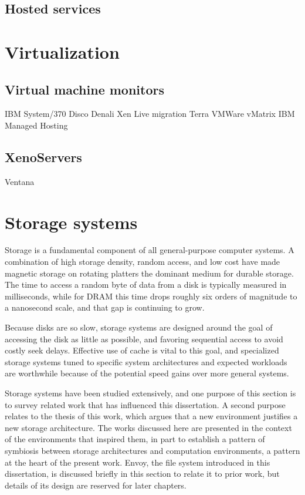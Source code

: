 \subsection{Hosted services}

\section{Virtualization}

\subsection{Virtual machine monitors}
IBM System/370 \cite{gum}
Disco
Denali
Xen \cite{barham}
Live migration \cite{clark} \cite{sapuntzakis02}
Terra \cite{garfinkel}
VMWare
vMatrix \cite{awadallah}
IBM Managed Hosting

\subsection{XenoServers}
\cite{kotsovinos04a,kotsovinos04b}

Ventana \cite{pfaff}

\section{Storage systems}

Storage is a fundamental component of all general-purpose computer systems. A combination of high storage density, random access, and low cost have made magnetic storage on rotating platters the dominant medium for durable storage. The time to access a random byte of data from a disk is typically measured in milliseconds, while for DRAM this time drops roughly six orders of magnitude to a nanosecond scale, and that gap is continuing to grow.

Because disks are so slow, storage systems are designed around the goal of accessing the disk as little as possible, and favoring sequential access to avoid costly seek delays. Effective use of cache is vital to this goal, and specialized storage systems tuned to specific system architectures and expected workloads are worthwhile because of the potential speed gains over more general systems.

Storage systems have been studied extensively, and one purpose of this section is to survey related work that has influenced this dissertation. A second purpose relates to the thesis of this work, which argues that a new environment justifies a new storage architecture. The works discussed here are presented in the context of the environments that inspired them, in part to establish a pattern of symbiosis between storage architectures and computation environments, a pattern at the heart of the present work. Envoy, the file system introduced in this dissertation, is discussed briefly in this section to relate it to prior work, but details of its design are reserved for later chapters.

